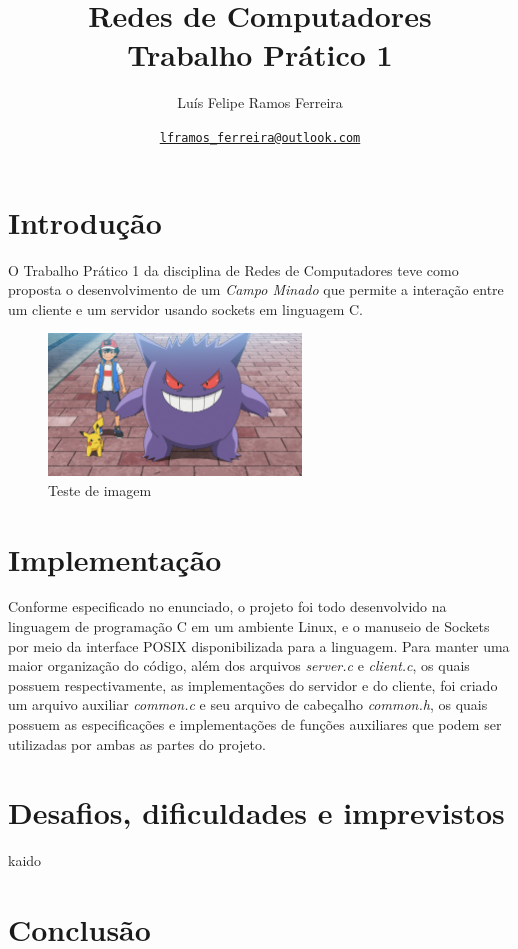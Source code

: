 \documentclass{article}
\title{Redes de Computadores \\ \large Trabalho Prático 1}
\author{Luís Felipe Ramos Ferreira}
\date{\href{mailto:lframos\_ferreira@outlook.com}{\texttt{lframos\_ferreira@outlook.com}}
}
\begin{document}
\maketitle

\section{Introdução}

O Trabalho Prático 1 da disciplina de Redes de Computadores teve como proposta
o desenvolvimento de um \textit{Campo Minado} que permite a interação entre um
cliente e um servidor usando sockets em linguagem C.

\begin{figure}[H]
      \centering
      \includegraphics[width=0.6\textwidth]{images/gengar.png}
      \caption{Teste de imagem}
\end{figure}

\section{Implementação}

Conforme especificado no enunciado, o projeto foi todo desenvolvido na
linguagem de programação C em um ambiente Linux, e o manuseio de Sockets por
meio da interface POSIX
disponibilizada para a linguagem. Para manter uma maior organização do código,
além dos arquivos \textit{server.c} e \textit{client.c}, os quais possuem
respectivamente, as implementações do servidor e do cliente,
foi criado um arquivo auxiliar \textit{common.c} e seu arquivo de cabeçalho
\textit{common.h}, os quais possuem as especificações e implementações de
funções auxiliares que podem ser utilizadas por ambas as partes do projeto.

\section{Desafios, dificuldades e imprevistos}

kaido

\section{Conclusão}
\end{document}
